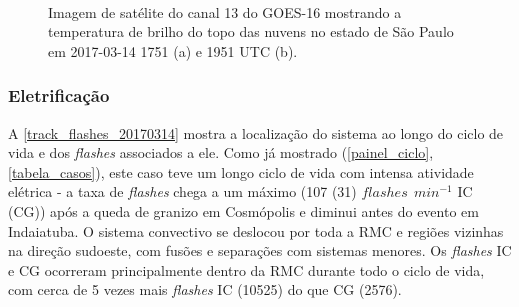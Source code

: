 %
\begin{figure}[hp]
	\begin{center}
		\caption{Imagem de satélite do canal 13 do GOES-16 mostrando a temperatura de brilho do topo das nuvens no estado de São Paulo em 2017-03-14 1751 (a) e 1951 UTC (b).} 
		\label{goes16_sp_20170314}
		 \\
	\end{center}
\end{figure}

\subsubsection{Eletrificação}\label{elec_201703014}

A \autoref{track_flashes_20170314} mostra a localização do sistema ao longo do ciclo de vida e dos \textit{flashes} associados a ele. Como já mostrado (\autoref{painel_ciclo}, \autoref{tabela_casos}), este caso teve um longo ciclo de vida com intensa atividade elétrica - a taxa de \textit{flashes} chega a um máximo (107 (31) $flashes\:\:min^{-1}$ IC (CG)) após a queda de granizo em Cosmópolis e diminui antes do evento em Indaiatuba. O sistema convectivo se deslocou por toda a RMC e regiões vizinhas na direção sudoeste, com fusões e separações com sistemas menores. Os \textit{flashes} IC e CG ocorreram principalmente dentro da RMC durante todo o ciclo de vida, com cerca de 5 vezes mais \textit{flashes} IC (10525) do que CG (2576).

